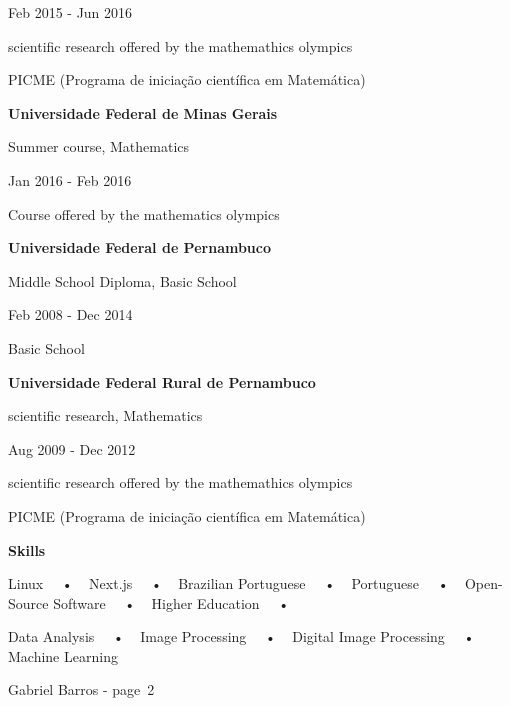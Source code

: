 Feb 2015 - Jun 2016

scientific research offered by the mathemathics olympics

PICME (Programa de iniciação científica em Matemática)

\textbf{Universidade Federal de Minas Gerais}

Summer course, Mathematics

Jan 2016 - Feb 2016

Course offered by the mathematics olympics

\textbf{Universidade Federal de Pernambuco}

Middle School Diploma, Basic School

Feb 2008 - Dec 2014

Basic School

\textbf{Universidade Federal Rural de Pernambuco}

scientific research, Mathematics

Aug 2009 - Dec 2012

scientific research offered by the mathemathics olympics

PICME (Programa de iniciação científica em Matemática)

\textbf{Skills}

Linux~~ • ~ Next.js~~ • ~ Brazilian Portuguese~~ • ~ Portuguese~~ • ~
Open-Source Software~~ • ~ Higher Education~~ • ~

Data Analysis~~ • ~ Image Processing~~ • ~ Digital Image Processing~~ •
~ Machine Learning

Gabriel Barros - page~2
